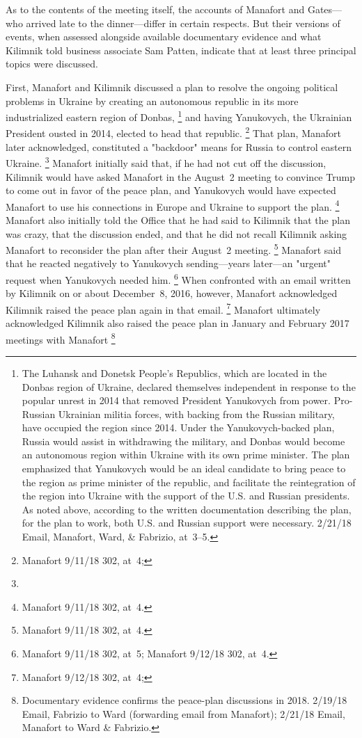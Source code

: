 As to the contents of the meeting itself, the accounts of Manafort and Gates---who arrived late to the dinner---differ in certain respects.
But their versions of events, when assessed alongside available documentary evidence and what Kilimnik told business associate Sam Patten, indicate that at least three principal topics were discussed.

First, Manafort and Kilimnik discussed a plan to resolve the ongoing political problems in Ukraine by creating an autonomous republic in its more industrialized eastern region of Donbas,%
\footnote{The Luhansk and Donetsk People's Republics, which are located in the Donbas region of Ukraine, declared themselves independent in response to the popular unrest in 2014 that removed President Yanukovych from power.
Pro-Russian Ukrainian militia forces, with backing from the Russian military, have occupied the region since 2014.
Under the Yanukovych-backed plan, Russia would assist in withdrawing the military, and Donbas would become an autonomous region within Ukraine with its own prime minister.
The plan emphasized that Yanukovych would be an ideal candidate to bring peace to the region as prime minister of the republic, and facilitate the reintegration of the region into Ukraine with the support of the U.S. and Russian presidents.
As noted above, according to  the written documentation describing the plan, for the plan to work, both U.S. and Russian support were necessary.
 2/21/18 Email, Manafort, Ward, \& Fabrizio, at~3--5.}
and having Yanukovych, the Ukrainian President ousted in 2014, elected to head that republic.%
\footnote{Manafort 9/11/18 302, at~4; }
That plan, Manafort later acknowledged, constituted a "backdoor" means for Russia to control eastern Ukraine.%
\footnote{}
Manafort initially said that, if he had not cut off the discussion, Kilimnik would have asked Manafort in the August~2 meeting to convince Trump to come out in favor of the peace plan, and Yanukovych would have expected Manafort to use his connections in Europe and Ukraine to support the plan.%
\footnote{Manafort 9/11/18 302, at~4.}
Manafort also initially told the Office that he had said to Kilimnik that the plan was crazy, that the discussion ended, and that he did not recall Kilimnik asking Manafort to reconsider the plan after their August~2 meeting.%
\footnote{Manafort 9/11/18 302, at~4.}
Manafort said
that he reacted negatively to Yanukovych sending---years later---an "urgent" request when Yanukovych needed him.%
\footnote{ Manafort 9/11/18 302, at~5;
Manafort 9/12/18 302, at~4.}
When confronted with an email written by Kilimnik on or about December~8, 2016, however, Manafort acknowledged Kilimnik raised the peace plan again in that email.%
\footnote{Manafort 9/12/18 302, at~4; }
Manafort ultimately acknowledged Kilimnik also raised the peace plan in January and February 2017 meetings with Manafort
\footnote{ Documentary evidence confirms the peace-plan discussions in 2018.
2/19/18 Email, Fabrizio to Ward (forwarding email from Manafort);
2/21/18 Email, Manafort to Ward \& Fabrizio.}


